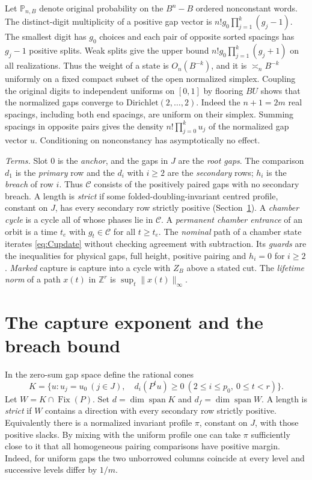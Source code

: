 \documentclass[11pt]{amsart}
\theoremstyle{definition}
\newcommand{\Z}{\mathbb Z}
\newcommand{\PP}{\mathbb P}
\newcommand{\C}{\mathcal C}
\begin{document}
Let \(\PP_{n,B}\) denote original probability on the \(B^n-B\)
ordered nonconstant words. The distinct-digit multiplicity of a positive
gap vector is \(n!g_0\prod_{j=1}^k(g_j-1)\).
The smallest digit has \(g_0\) choices and each pair of opposite
sorted spacings has \(g_j-1\) positive splits. Weak splits give the upper
bound \(n!g_0\prod_{j=1}^k(g_j+1)\) on all realizations.
Thus the weight of a state is \(O_n(B^{-k})\), and it is
\(\asymp_n B^{-k}\) uniformly on a fixed compact subset of the
open normalized simplex. Coupling the original digits to independent
uniforms on \([0,1]\) by flooring \(BU\) shows that the normalized gaps
converge to \(\mathrm{Dirichlet}(2,\ldots,2)\). Indeed the \(n+1=2m\)
real spacings, including both end spacings, are uniform on their simplex.
Summing spacings in opposite pairs gives the density
\(n!\prod_{j=0}^ku_j\) of the normalized gap vector \(u\). Conditioning
on nonconstancy has asymptotically no effect.

\emph{Terms.} Slot 0 is the \emph{anchor}, and the gaps in \(J\) are
the \emph{root gaps}. The comparison \(d_1\) is the \emph{primary} row
and the \(d_i\) with \(i\ge2\) are the \emph{secondary} rows; \(h_i\) is
the \emph{breach} of row \(i\). Thus \(\C\) consists of the positively
paired gaps with no secondary breach. A length is \emph{strict} if some
folded-doubling-invariant centred profile, constant on \(J\), has every
secondary row strictly positive (Section~\ref{sec:clock}). A
\emph{chamber cycle} is a cycle all of whose phases lie in \(\C\). A
\emph{permanent chamber entrance} of an orbit is a time \(t_e\) with
\(g_t\in\C\) for all \(t\ge t_e\). The \emph{nominal} path of a chamber
state iterates \eqref{eq:Cupdate} without checking agreement with
subtraction. Its \emph{guards} are the inequalities for physical gaps,
full height, positive pairing and \(h_i=0\) for \(i\ge2\).
\emph{Marked} capture is capture into a cycle with \(Z_B\) above a
stated cut. The \emph{lifetime norm} of a path \(x(t)\) in \(\Z^r\) is
\(\sup_t\|x(t)\|_\infty\).

\section{The capture exponent and the breach bound}\label{sec:clock}

In the zero-sum gap space define the rational cones
\[
 K=\{u:u_j=u_0\ (j\in J),\quad
 d_i(P^t u)\ge0\ (2\le i\le p_0,\ 0\le t<r)\}.
\]
Let \(W=K\cap\operatorname{Fix}(P)\). Set \(d=\dim\operatorname{span}K\) and
\(d_f=\dim\operatorname{span}W\). A length is \emph{strict} if
\(W\) contains a direction with every secondary row strictly positive.
Equivalently there is a normalized invariant profile \(\pi\), constant
on \(J\), with those positive slacks. By mixing with the uniform
profile one can take \(\pi\) sufficiently close to it that all homogeneous
pairing comparisons have positive margin. Indeed, for uniform gaps the
two unborrowed columns coincide at every level and successive levels
differ by \(1/m\).
\end{document}
